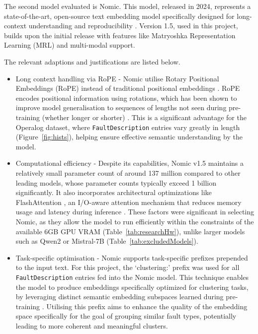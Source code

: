 \documentclass[10pt,oneside]{report}
\begin{document}
The second model evaluated is Nomic. This model, released in 2024, represents a state-of-the-art, open-source text embedding model specifically designed for long-context understanding and reproducibility \cite{nussbaum2024nomic, nussbaum2024nomic1.5}. Version 1.5, used in this project, builds upon the initial release with features like Matryoshka Representation Learning (MRL) and multi-modal support.


The relevant adaptions and justifications are listed below.
\begin{itemize}
    \item Long context handling via RoPE - Nomic utilise Rotary Positional Embeddings (RoPE) instead of traditional positional embeddings \cite{su2024roformer, nussbaum2024nomic, vaswani2017attention}. RoPE encodes positional information using rotations, which has been shown to improve model generalisation to sequences of lengths not seen during pre-training (whether longer or shorter) \cite{su2024roformer}. This is a significant advantage for the Operalog dataset, where \texttt{FaultDescription} entries vary greatly in length (Figure~\ref{fig:hists}), helping ensure effective semantic understanding by the model.
    \item Computational efficiency - Despite its capabilities, Nomic v1.5 maintains a relatively small parameter count of around 137 million compared to other leading models, whose parameter counts typically exceed 1 billion significantly. It also incorporates architectural optimizations like FlashAttention \cite{dao2022flashattention}, an I/O-aware attention mechanism that reduces memory usage and latency during inference \cite{nussbaum2024nomic}. These factors were significant in selecting Nomic, as they allow the model to run efficiently within the constraints of the available 6GB GPU VRAM (Table~\ref{tab:researchHw}), unlike larger models such as Qwen2 or Mistral-7B (Table~\ref{tab:excludedModels}).
    \item Task-specific optimisation - Nomic supports task-specific prefixes prepended to the input text. For this project, the `clustering:' prefix was used for all \texttt{FaultDescription} entries fed into the Nomic model. This technique enables the model to produce embeddings specifically optimized for clustering tasks, by leveraging distinct semantic embedding subspaces learned during pre-training \cite{nussbaum2024nomic}. Utilising this prefix aims to enhance the quality of the embedding space specifically for the goal of grouping similar fault types, potentially leading to more coherent and meaningful clusters.

\end{itemize}
\end{document}
